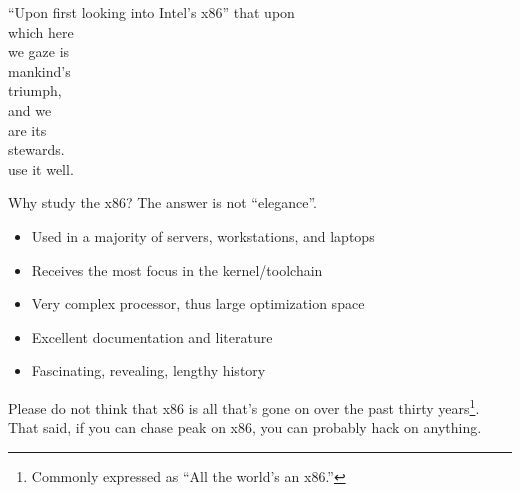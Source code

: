 \documentclass[mathserif,xcolor={dvipsnames,table}]{beamer}
\begin{document}
{
\begin{frame}{``Upon first looking into Intel's x86''}
\hfill that upon\\
\hfill which here\\
\hfill we gaze is\\
\hfill mankind's\\
\hfill triumph,\\
\vspace{.8in}
\hfill and we\\
\hfill are its\\
\hfill stewards.\\
\vspace{.5in}
\hfill use it well.\\
\end{frame}
}

\begin{frame}{Why study the x86?}
The answer is not ``elegance''.
\vfill
\begin{itemize}
\item Used in a majority of servers, workstations, and laptops
\item Receives the most focus in the kernel/toolchain
\item Very complex processor, thus large optimization space
\item Excellent documentation and literature
\item Fascinating, revealing, lengthy history
\end{itemize}
\vfill
Please do not think that x86 is all that's gone on over the past
thirty years\footnote{Commonly expressed as ``All the world's an x86.''}. That said, if you can chase peak on x86, you can
probably hack on anything.
\end{frame}
\end{document}
